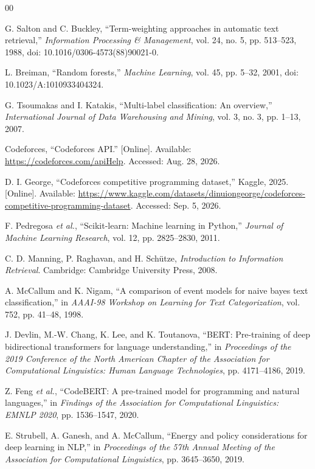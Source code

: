 \documentclass[conference]{IEEEtran}
\begin{document}
\begin{thebibliography}{00}

G. Salton and C. Buckley,
``Term-weighting approaches in automatic text retrieval,''
\emph{Information Processing \& Management},
vol. 24, no. 5, pp. 513--523, 1988,
doi: 10.1016/0306-4573(88)90021-0.

L. Breiman,
``Random forests,''
\emph{Machine Learning},
vol. 45, pp. 5--32, 2001,
doi: 10.1023/A:1010933404324.

G. Tsoumakas and I. Katakis,
``Multi-label classification: An overview,''
\emph{International Journal of Data Warehousing and Mining},
vol. 3, no. 3, pp. 1--13, 2007.

Codeforces,
``Codeforces API.''
[Online]. Available:
\url{https://codeforces.com/apiHelp}.
Accessed: Aug. 28, 2026.

D. I. George,
``Codeforces competitive programming dataset,''
Kaggle, 2025. [Online]. Available:
\url{https://www.kaggle.com/datasets/dinuiongeorge/codeforces-competitive-programming-dataset}.
Accessed: Sep. 5, 2026.

F. Pedregosa \emph{et al.},
``Scikit-learn: Machine learning in Python,''
\emph{Journal of Machine Learning Research},
vol. 12, pp. 2825--2830, 2011.

C. D. Manning, P. Raghavan, and H. Sch\"{u}tze,
\emph{Introduction to Information Retrieval}.
Cambridge: Cambridge University Press, 2008.

A. McCallum and K. Nigam,
``A comparison of event models for naive bayes text classification,''
in \emph{AAAI-98 Workshop on Learning for Text Categorization},
vol. 752, pp. 41--48, 1998.

J. Devlin, M.-W. Chang, K. Lee, and K. Toutanova,
``BERT: Pre-training of deep bidirectional transformers for language
understanding,''
in \emph{Proceedings of the 2019 Conference of the North American
Chapter of the Association for Computational Linguistics:
Human Language Technologies},
pp. 4171--4186, 2019.

Z. Feng \emph{et al.},
``CodeBERT: A pre-trained model for programming and natural languages,''
in \emph{Findings of the Association for Computational Linguistics:
EMNLP 2020},
pp. 1536--1547, 2020.

E. Strubell, A. Ganesh, and A. McCallum,
``Energy and policy considerations for deep learning in NLP,''
in \emph{Proceedings of the 57th Annual Meeting of the
Association for Computational Linguistics},
pp. 3645--3650, 2019.


\end{thebibliography}
\end{document}

